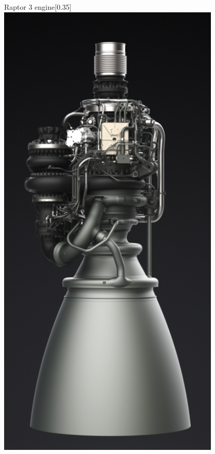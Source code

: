\begin{figure}[H]
    \centering
    \begin{subcaptionbox}{Raptor 3 engine\footnotemark[1]\label{fig:Raptor_3}}[0.35\linewidth]
        {\includegraphics[width=\linewidth]{figures/LiteratureStudy/raptor_3.png}}

\end{subcaptionbox}
\end{figure}
